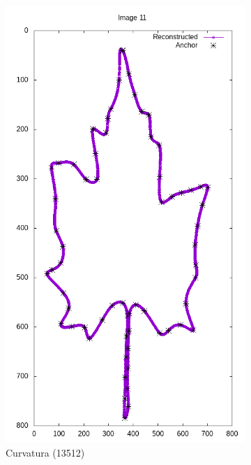 \begin{frame}
\begin{figure}[ht!]
\begin{subfigure}[t]{0.24\textwidth}
			\includegraphics[width=\textwidth]{img/rec/11cur(13512).png}
			\caption{Curvatura (13512)}
		\end{subfigure}
		\begin{subfigure}[t]{0.24\textwidth}
			\centering

\end{subfigure}
\end{figure}
\end{frame}
